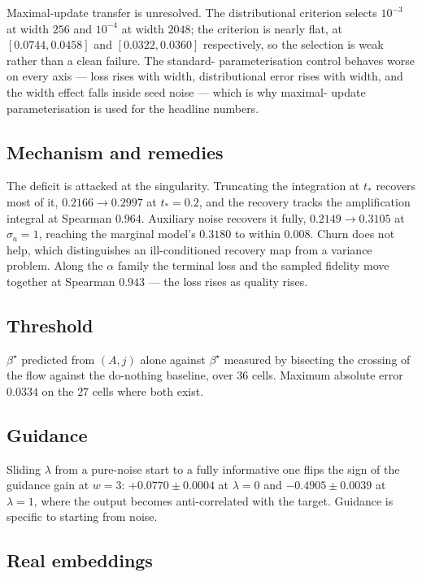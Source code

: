 \documentclass[11pt]{article}
\begin{document}
Maximal-update transfer is unresolved. The distributional criterion selects $10^{-3}$ at width
$256$ and $10^{-4}$ at width $2048$; the criterion is nearly flat, at $[0.0744,0.0458]$ and
$[0.0322,0.0360]$ respectively, so the selection is weak rather than a clean failure. The standard-
parameterisation control behaves worse on every axis --- loss rises with width, distributional
error rises with width, and the width effect falls inside seed noise --- which is why maximal-
update parameterisation is used for the headline numbers.

\subsection{Mechanism and remedies}

The deficit is attacked at the singularity. Truncating the integration at $t_\ast$ recovers most of
it, $0.2166\to0.2997$ at $t_\ast=0.2$, and the recovery tracks the amplification integral at
Spearman $0.964$. Auxiliary noise recovers it fully, $0.2149\to0.3105$ at $\sigma_a=1$, reaching
the marginal model's $0.3180$ to within $0.008$. Churn does not help, which distinguishes an
ill-conditioned recovery map from a variance problem. Along the $\alpha$ family the terminal loss
and the sampled fidelity move together at Spearman $0.943$ --- the loss rises as quality rises.

\subsection{Threshold}

$\beta^\star$ predicted from $(A,j)$ alone against $\beta^\star$ measured by bisecting the
crossing of the flow against the do-nothing baseline, over $36$ cells. Maximum absolute error
$0.0334$ on the $27$ cells where both exist.

\subsection{Guidance}

Sliding $\lambda$ from a pure-noise start to a fully informative one flips the sign of the
guidance gain at $w=3$: $+0.0770\pm0.0004$ at $\lambda=0$ and $-0.4905\pm0.0039$ at $\lambda=1$,
where the output becomes anti-correlated with the target. Guidance is specific to starting from
noise.

\subsection{Real embeddings}
\end{document}
